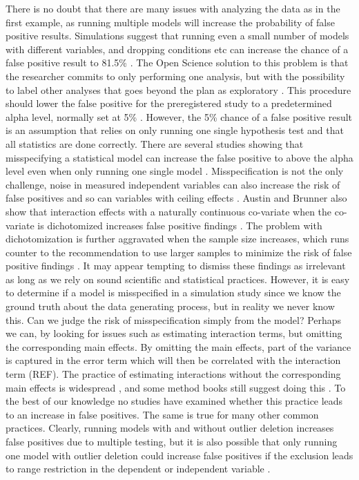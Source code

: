 There is no doubt that there are many issues with analyzing the data as in the first example, as running multiple models will increase the probability of false positive results. Simulations suggest that running even a small number of models with different variables, and dropping conditions  etc can increase the chance of a false positive result to 81.5\% \citep{Simmons2011}. The Open Science solution to this problem is that the researcher commits to only performing one analysis, but with the possibility to label other analyses that goes beyond the plan as exploratory \citep{Nosek2018}. This procedure should lower the false positive for the preregistered study to a predetermined alpha level, normally set at 5\% \citep{Moore2016}. However, the 5\% chance of a false positive result is an assumption that relies on only running one single hypothesis test and that all statistics are done correctly. There are several studies showing that misspecifying a  statistical model can increase the false positive to above the alpha level even when only running one single model \citep{Dennis2019,Litiere2007}. Misspecification is not the only challenge, noise in measured independent variables can also increase the risk of false positives \citep{Brunner2009} and so can variables with ceiling effects \citep{Austin2003}. Austin and Brunner also show that interaction effects with a naturally continuous co-variate when the co-variate is dichotomized increases false positive findings \citep{Austin2004}. The problem with dichotomization is further aggravated when the sample size increases, which runs counter to the recommendation to use larger samples to minimize the risk of false positive findings \citep{Simmons2011}. It may appear tempting to dismiss these findings as irrelevant as long as we rely on sound scientific and statistical practices. However, it is easy to determine if a model is misspecified in a simulation study since we know the ground truth about the data generating process, but in reality we never know this. Can we judge the risk of misspecification simply from the model? Perhaps we can, by looking for issues such as estimating interaction terms, but omitting the corresponding main effects. By omitting the main effects, part of the variance is captured in the error term which will then be correlated with the interaction term (REF). The practice of estimating interactions without the corresponding main effects is widespread \citep{Branbor2006}, and some method books still suggest doing this \citep{Cleves2008}. To the best of our knowledge no studies have examined whether this practice leads to an increase in false positives. The same is true for many other common practices. Clearly, running models with and without outlier deletion increases false positives due to multiple testing, but it is also possible that only running one model with outlier deletion could increase false positives if the exclusion leads to range restriction in the dependent or independent variable \citep{Raju2003}. \\        

